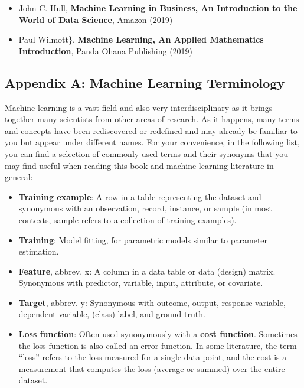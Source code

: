 \documentclass[11pt]{article}
\begin{document}
\begin{itemize}
\item
  John C. Hull, \textbf{Machine Learning in Business, An Introduction to
  the World of Data Science}, Amazon (2019)
\item
  Paul Wilmott\}, \textbf{Machine Learning, An Applied Mathematics
  Introduction}, Panda Ohana Publishing (2019)
\end{itemize}

    \hypertarget{appendix-a-machine-learning-terminology}{%
\subsection{Appendix A: Machine Learning
Terminology}\label{appendix-a-machine-learning-terminology}}

Machine learning is a vast field and also very interdisciplinary as it
brings together many scientists from other areas of research. As it
happens, many terms and concepts have been rediscovered or redefined and
may already be familiar to you but appear under different names. For
your convenience, in the following list, you can find a selection of
commonly used terms and their synonyms that you may find useful when
reading this book and machine learning literature in general:

\begin{itemize}
\item
  \textbf{Training example}: A row in a table representing the dataset
  and synonymous with an observation, record, instance, or sample (in
  most contexts, sample refers to a collection of training examples).
\item
  \textbf{Training}: Model fitting, for parametric models similar to
  parameter estimation.
\item
  \textbf{Feature}, abbrev. x: A column in a data table or data (design)
  matrix. Synonymous with predictor, variable, input, attribute, or
  covariate.
\item
  \textbf{Target}, abbrev. y: Synonymous with outcome, output, response
  variable, dependent variable, (class) label, and ground truth.
\item
  \textbf{Loss function}: Often used synonymously with a \textbf{cost
  function}. Sometimes the loss function is also called an error
  function. In some literature, the term ``loss'' refers to the loss
  measured for a single data point, and the cost is a measurement that
  computes the loss (average or summed) over the entire dataset.
\end{itemize}


    
    
    
\end{document}
